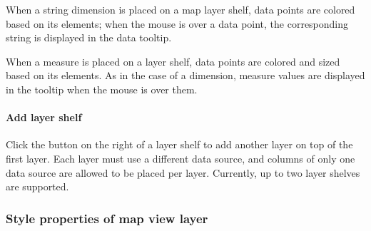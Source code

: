 \documentclass[letterpaper,10pt,english]{sphinxmanual}
\begin{document}
When a string dimension is placed on a map layer shelf, data points are colored based on its elements; when the mouse is over a data point, the corresponding string is displayed in the data tooltip.
\begin{quote}

\begin{figure}[H]
\centering

\noindent{}
\end{figure}
\end{quote}

When a measure is placed on a layer shelf, data points are colored and sized based on its elements. As in the case of a dimension, measure values are displayed in the tooltip when the mouse is over them.
\begin{quote}

\begin{figure}[H]
\centering

\noindent{}
\end{figure}
\end{quote}


\paragraph{Add layer shelf}
\label{\detokenize{discovery/part04/map_chart:id4}}
Click the \sphinxcode{\sphinxupquote{+}} button on the right of a layer shelf to add another layer on top of the first layer. Each layer must use a different data source, and columns of only one data source are allowed to be placed per layer. Currently, up to two layer shelves are supported.
\begin{quote}

\begin{figure}[H]
\centering

\noindent{}
\end{figure}
\end{quote}


\subsubsection{Style properties of map view layer}
\label{\detokenize{discovery/part04/map_chart:id5}}
\end{document}
